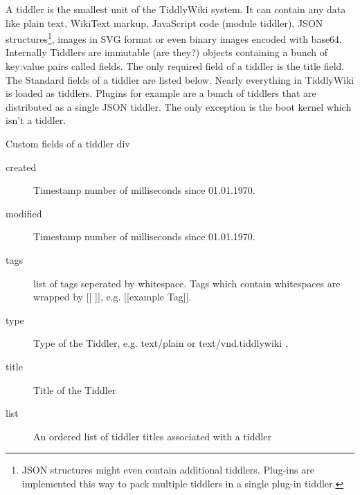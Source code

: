 \documentclass[12pt,a4paper]{scrartcl}
\begin{document}
A tiddler is the smallest unit of the TiddlyWiki system. It can contain any data like plain text, WikiText markup, JavaScript code (module tiddler), JSON structures\footnote{JSON structures might even contain additional tiddlers. Plug-ins are implemented this way to pack multiple tiddlers in a single plug-in tiddler.}, images in SVG format or even binary images encoded with base64.
Internally Tiddlers are immutable (are they?) objects containing a bunch of key:value pairs called fields. The only required field of a tiddler is the title field. The Standard fields of a tiddler are listed below. Nearly everything in TiddlyWiki is loaded as tiddlers. Plugins for example are a bunch of tiddlers that are distributed as a single JSON tiddler. The only exception is the boot kernel which isn't a tiddler.
\begin{lablist}
\caption{Custom fields of a tiddler div}
\label{list:TiddlerFields}
\begin{description}
\item[created] Timestamp number of milliseconds since 01.01.1970.
\item[modified] Timestamp number of milliseconds since 01.01.1970.
\item[tags] list of tags seperated by whitespace. Tags which contain whitespaces are wrapped by [[ ]], e.g. [[example Tag]].
\item[type] Type of the Tiddler, e.g. text/plain or text/vnd.tiddlywiki .
\item[title] Title of the Tiddler
\item[list] An ordered list of tiddler titles associated with a tiddler
\end{description}
\end{lablist}
\end{document}
